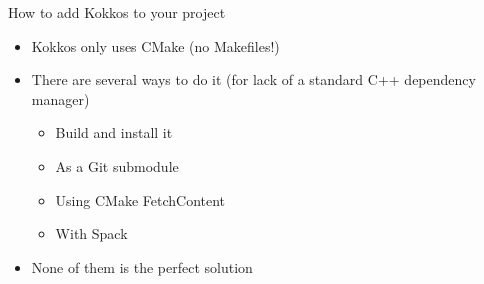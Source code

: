 \documentclass[
    aspectratio=169,
    \createHandout
]{beamer}
\begin{document}
\begin{frame}{How to add Kokkos to your project}
    \begin{itemize}
        \item Kokkos only uses CMake (no Makefiles!)
        \item There are several ways to do it (for lack of a standard C++ dependency manager)
        \begin{itemize}
            \item Build and install it
            \item As a Git submodule
            \item Using CMake FetchContent
            \item With Spack
        \end{itemize}
        \item None of them is the perfect solution
    \end{itemize}
\end{frame}

\end{document}
